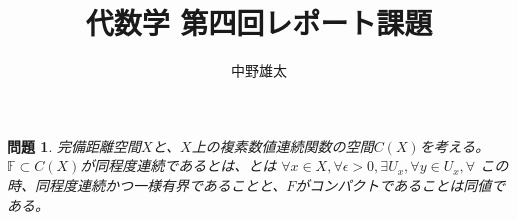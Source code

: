 \documentclass{ltjsarticle}
\begin{document}
\theoremstyle{plain}
\newtheorem{prob}{問題}
\newtheorem{lem}{補題}
\newcommand{\Rinf}{\mathbb{R}^{\infty}}
\newcommand{\topoinf}{\mathfrak{O_\infty}}
\newcommand{\mR}{\mathbb{R}}
\newcommand{\mN}{\mathbb{N}}
\newcommand{\fb}{\mathfrak{B}}
\newcommand{\fbb}{\mathfrak{B}'}
\newcommand{\mP}{\mathcal{P}}
\newcommand{\Ker}{\operatorname{Ker}}
\newcommand{\rank}{\operatorname{rank}}
\title{代数学 第四回レポート課題}
\author{中野雄太}
\maketitle
\begin{prob}
    完備距離空間$X$と、$X$上の複素数値連続関数の空間$C(X)$を考える。 \\
    $\mathbb{F} \subset C(X)$が同程度連続であるとは、とは
    $\forall x\in X,\forall \epsilon>0,\exists U_x,\forall y\in U_x,\forall$
    この時、同程度連続かつ一様有界であることと、$F$がコンパクトであることは同値である。
\end{prob}
\end{document}
